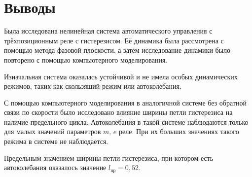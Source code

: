 	\clearpage
	
	\section{Выводы}
	
	Была исследована нелинейная система автоматического управления с трёхпозиционным реле с гистерезисом. Её динамика была рассмотрена с помощью метода фазовой плоскости, а затем исследование динамики было повторено с помощью компьютерного моделирования.
	
	Изначальная система оказалась устойчивой и не имела особых динамических режимов, таких как скользящий режим или автоколебания.
	
	С помощью компьютерного моделирования в аналогичной системе без обратной связи по скорости было исследовано влияние ширины петли гистерезиса на наличие предельного цикла. Автоколебания в такой системе наблюдаются только для малых значений параметров $m,\,e$ реле. При их больших значениях такого режима в системе не наблюдается. 
	
	Предельным значением ширины петли гистерезиса, при котором есть автоколебания оказалось значение $l_\text{пр} = 0,52$. 
	

